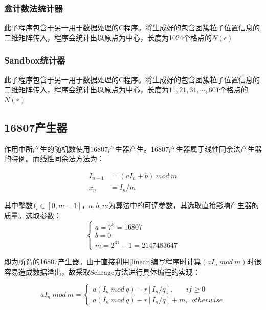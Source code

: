 \documentclass[a4paper,11pt]{article}
\begin{document}
\subsubsection{盒计数法统计器}
此子程序包含于另一用于数据处理的C程序。将生成好的包含团簇粒子位置信息的二维矩阵传入，程序会统计出以原点为中心，长度为1024个格点的$N(\epsilon)$


\subsubsection{Sandbox统计器}
此子程序包含于另一用于数据处理的C程序。将生成好的包含团簇粒子位置信息的二维矩阵传入，程序会统计出以原点为中心，长度为$11,21,31,\cdots ,601$个格点的$N(r)$



\subsection{16807产生器}
作用中所产生的随机数使用16807产生器产生。16807产生器属于线性同余法产生器的特例。而线性同余法方法为：

\begin{equation}
\begin{aligned}
	I_{n+1} &= (aI_{n} + b) \ mod \ m \\
	x_{n} &= I_{n}/m
\end{aligned}
\label{linear}	
\end{equation}

其中整数$I_{i} \in [0,m-1]$，$a,b,m$为算法中的可调参数，其选取直接影响产生器的质量。选取参数：
\begin{equation}
\left\{
\begin{array}{l}
	a = 7^{5} = 16807 \\
	b = 0 \\
	m = 2^{31}-1 = 2147483647
\end{array}
\right.
\end{equation}

即为所谓的16807产生器。由于直接利用\ref{linear}编写程序时计算$(aI_{n} \ mod \ m )$时很容易造成数据溢出，故采取Schrage方法进行具体编程的实现：

\begin{equation}
aI_{n} \ mod \ m = \left\{
\begin{array}{l}
	a(I_{n}\ mod \ q) - r[I_{n}/q],\ \ \ \ \ \ \ \ if \geq 0 \\
	a(I_{n}\ mod \ q) - r[I_{n}/q] + m,\ \ otherwise	
\end{array}
\right.
\end{equation}
\end{document}
